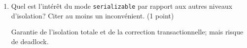 \begin{enumerate}
\begin{solution}
Réponse 1
\end{solution}

\item Quel est l'intérêt du mode \texttt{serializable} par rapport aux autres niveaux d'isolation? Citer au moins un inconvénient. (1 point)

\begin{solution}
Garantie de l'isolation totale et de la correction transactionnelle; mais risque de deadlock.
\end{solution}



\end{enumerate}
